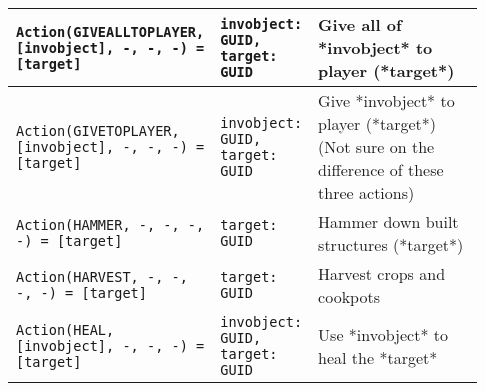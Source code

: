 \begin{table}[htb]
{\begin{longtable}{ | p{0.35\linewidth} | p{0.18\linewidth} | p{0.4\linewidth} | }
		\texttt{Action(GIVEALLTOPLAYER, [invobject], -, -, -) = [target]} & \texttt{{invobject: GUID, target: GUID}} & Give all of *invobject* to player (*target*) \\ \hline 
		\texttt{Action(GIVETOPLAYER, [invobject], -, -, -) = [target]} & \texttt{{invobject: GUID, target: GUID}} & Give *invobject* to player (*target*) (Not sure on the difference of these three actions) \\ \hline 
		\texttt{Action(HAMMER, -, -, -, -) = [target]} & \texttt{{target: GUID}} & Hammer down built structures (*target*) \\ \hline 
		\texttt{Action(HARVEST, -, -, -, -) = [target]} & \texttt{{target: GUID}} & Harvest crops and cookpots \\ \hline 
		\texttt{Action(HEAL, [invobject], -, -, -) = [target]} & \texttt{{invobject: GUID, target: GUID}} & Use *invobject* to heal the *target* \\ \hline 
	\end{longtable}
    }
\end{table}

